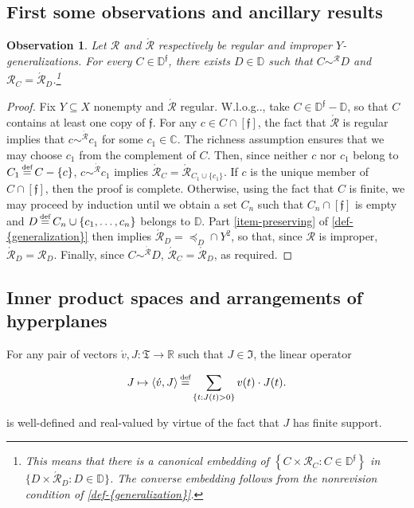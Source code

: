 \documentclass[ecta,nameyear,draft]{econsocart}
\makeatletter
\newcommand{\bs}{-}%
\newcommand{\R}{\mathbb R}
\newcommand{\mc}{\mathcal}
\newcommand\defeq{\mathrel{\overset{\makebox[0pt]{\mbox{\normalfont\tiny def}}}{=}}}%
\newcommand{\novel}{\mathfrak f}
\newcommand{\preceqb}{\mathbin{\preceq}}
\newcommand{\ext}{\mathrel{\mc R}}
\newcommand{\extb}{\mathbin{\mc R}}
\newcommand{\aext}{\mathrel{\acute{\mathrel{\mathcal R}}}}
\newcommand{\aextb}{\mathbin{\acute{\mathbin{\mathcal R}}}}
\newcommand{\mbbd}{{\mathds D}}
\newcommand{\mbbdp}{{\mathds D^{\novel}}}
\newcommand{\mbbc}{{\mathds C}}
\newcommand{\mbbtpp}{{\mathfrak{T}}}
\newcommand{\mbbjpp}{\mathfrak{I}}
\newcommand\Wlog{W\@.l\@.o\@.g\@ifnextchar.{}{.\@}}
\theoremstyle{plain}
\newtheorem{observation}{Observation}
\theoremstyle{remark}
\makeatother
\begin{document}
\begin{appendix}
  \subsection{First some observations and ancillary results}
  \begin{observation}\label{obs-reg-eq}%
    Let $\ext$ and $\aext$ respectively be regular and improper
    $Y$-{generalization}s. For every $C \in \mbbdp$, there exists $D \in \mbbd$
    such that $C \sim^{\extb} D$ and $\extb_{C} = \aextb_{D}$.\footnote{This
      means that there is a canonical embedding of $\left\{C \times \extb_{C}: C
      \in \mbbdp\right\}$ in $\{D \times \aextb_{D}: D \in \mbbd\}$. The
      converse embedding follows from the nonrevision condition of
    \cref{def-{generalization}}.}
  \end{observation}
  \begin{proof}\label{proof-reg-eq} Fix $Y\subseteq X$ nonempty and $\aext$
    regular.  \Wlog, take $C \in \mbbdp \bs \mbbd$, so that $C$ contains at least
    one copy of $\novel$.  For any $c \in C \cap [ \novel ]$, the fact that
    $\aext$
    is regular implies that $c \sim^{\aextb} c _ 1$ for some $c _ 1 \in \mbbc$. 
    The richness assumption ensures that we may choose $c _ 1$ from the
    complement of $C$.  Then, since neither $c$ nor
    $c_{1}$ belong to $C _ 1 \defeq C \bs \{c\}$, $c \sim^{\aextb} c_{1}$ implies
    $\aextb_{C} = \aextb _ {C _ 1 \cup \{c_{1}\}}$.  If $c$ is the unique member
    of $C \cap [ \novel ]$, then the proof is complete.  Otherwise, using the
    fact that $C$ is finite, we may proceed by induction until we obtain a set $C
    _ n$ such that $C _ n \cap [\novel ]$ is empty and $D \defeq C _ n \cup \{c _
    1 , \dots , c _ n \}$ belongs to $\mbbd$.  Part \ref{item-preserving} of
    \cref{def-{generalization}} then implies $\aextb _ { D} = \preceqb _ {D} \cap
    Y^{2}$, so that, since $\ext$ is improper, $\aextb_{D}=\extb_{D}$.  Finally,
    since $C \sim^{\aextb} D$, $\aextb _ {C} = \aextb_{D}$, as required.
  \end{proof}

  \subsection{Inner product spaces and arrangements of hyperplanes}
  For any pair of vectors $\acute v, J: \mbbtpp \rightarrow \R$ such that $J
  \in \mbbjpp$, the linear operator
  \begin{linenomath*}
    \begin{equation*}
      J \mapsto \langle \acute v, J \rangle \defeq \sum_{\{t : J(t) > 0\}} v(t)
      \cdot J(t).
    \end{equation*}
  \end{linenomath*}
  is well-defined and real-valued by virtue of the fact that $J$ has finite
  support.


\end{appendix}
\end{document}
